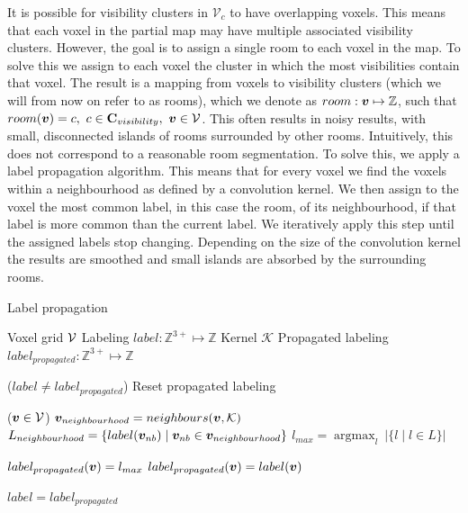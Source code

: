 It is possible for visibility clusters in \(\mathcal{V}_{c}\) to have overlapping voxels. This means that each voxel in the partial map may have multiple associated visibility clusters. However, the goal is to assign a single room to each voxel in the map. To solve this we assign to each voxel the cluster in which the most visibilities contain that voxel. The result is a mapping from voxels to visibility clusters (which we will from now on refer to as rooms), which we denote as \(room: \boldsymbol{v} \mapsto \mathbb{Z}\), such that \(room(\boldsymbol{v}) = c,\ c \in \mathbf{C}_{visibility},\ \boldsymbol{v} \in \mathcal{V}\). This often results in noisy results, with small, disconnected islands of rooms surrounded by other rooms. Intuitively, this does not correspond to a reasonable room segmentation. To solve this, we apply a label propagation algorithm. This means that for every voxel we find the voxels within a neighbourhood as defined by a convolution kernel. We then assign to the voxel the most common label, in this case the room, of its neighbourhood, if that label is more common than the current label. We iteratively apply this step until the assigned labels stop changing. Depending on the size of the convolution kernel the results are smoothed and small islands are absorbed by the surrounding rooms.


\begin{algorithm}
    \caption{Label propagation}
    \begin{algorithmic}

    \Require \quad Voxel grid \(\mathcal{V}\)
    \Require \quad Labeling \(label: \mathbb{Z}^{3+} \mapsto \mathbb{Z}\)
    \Require \quad Kernel \(\mathcal{K}\)
    \Ensure \quad Propagated labeling \(label_{propagated}: \mathbb{Z}^{3+} \mapsto \mathbb{Z}\)

    \While($label \neq label_{propagated}$) 
        \State Reset propagated labeling 

        \ForEach($\boldsymbol{v} \in \mathcal{V}$)
            \State $\boldsymbol{v}_{neighbourhood} = neighbours(\boldsymbol{v}, \mathcal{K})$
            \State $L_{neighbourhood} = \{label(\boldsymbol{v}_{nb}) \mid \boldsymbol{v}_{nb} \in \boldsymbol{v}_{neighbourhood} \}$
            \State $l_{max} = \mathop{argmax}_{l} \ |\{l \mid l \in L\}|$ 

             
                \State \(label_{propagated}(\boldsymbol{v}) = l_{max}\)
            \Else
                \State \(label_{propagated}(\boldsymbol{v}) = label(\boldsymbol{v})\)
            \EndIf
        \EndFor

        \State $label = label_{propagated}$ 
    \EndWhile
    \end{algorithmic}
\end{algorithm}

